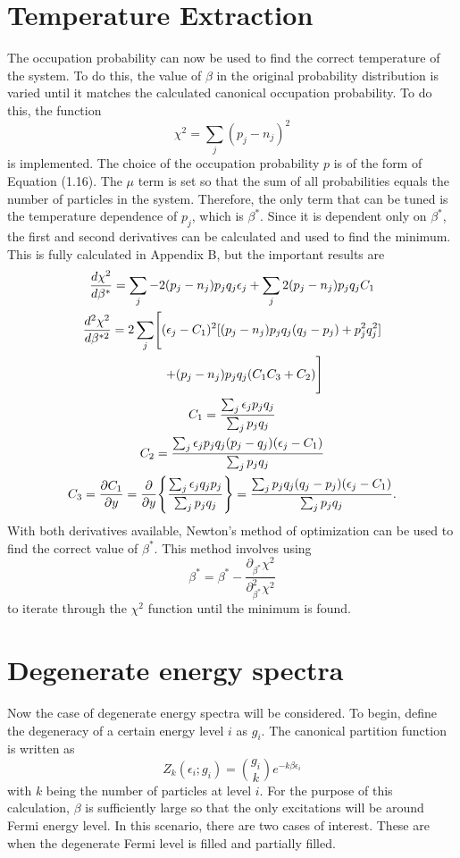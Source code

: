 \section{Temperature Extraction}
The occupation probability can now be used to find the correct temperature of the system. To do this, the value of $\beta$ in the original probability distribution is varied until it matches the calculated canonical occupation probability. To do this, the function 
\begin{equation}
    \chi^2=\sum_j(p_j-n_j)^2
\end{equation}
is implemented. The choice of the occupation probability $p$ is of the form of Equation (1.16). The $\mu$ term is set so that the sum of all probabilities equals the number of particles in the system. Therefore, the only term that can be tuned is the temperature dependence of $p_j$, which is $\beta^*$. Since it is dependent only on $\beta^*$, the first and second derivatives can be calculated and used to find the minimum. This is fully calculated in Appendix B, but the important results are 
\begin{gather}
    \frac{d\chi^2}{d\beta^*}=\sum_j -2(p_j-n_j)p_j q_j \epsilon_j+\sum_j 2(p_j-n_j)p_j q_j C_1\\
    \frac{d^2\chi^2}{d\beta^{*2}}=2\sum_j\Biggr[(\epsilon_j-C_1)^2[(p_j-n_j)p_jq_j(q_j-p_j)+p_j^2q_j^2]\nonumber\\
    \ \ \ \ \ \ +(p_j-n_j)p_jq_j(C_1C_3+C_2)\Biggr]\\
    C_1=\frac{\sum_j \epsilon_j p_j q_j}{\sum_j p_j q_j}\\
    C_2=\frac{\sum_j \epsilon_j p_j q_j(p_j - q_j)(\epsilon_j-C_1)}{\sum_j p_j q_j}\\
    C_3=\frac{\partial C_1}{\partial y}=\frac{\partial}{\partial 
    y}\qty{\frac{\sum_j \epsilon_j q_j p_j}{\sum_j p_j q_j}}=\frac{\sum_j p_j q_j(q_j-p_j)(\epsilon_j-C_1)}{\sum_j p_j q_j}.
\end{gather}
With both derivatives available, Newton's method of optimization can be used to find the correct value of $\beta^*$. This method involves using 
\begin{equation}
    \beta^*=\beta^*-\frac{\partial_{\beta^*}\chi^2}{\partial^2_{\beta^*}\chi^2}
\end{equation}
to iterate through the $\chi^2$ function until the minimum is found.

\section{Degenerate energy spectra}
Now the case of degenerate energy spectra will be considered. To begin, define the degeneracy of a certain energy level $i$ as $g_i$. The canonical partition function is written as
\begin{equation}
    Z_k(\epsilon_i;g_i)={g_i \choose k} e^{-k\beta\epsilon_i}
\end{equation}
with $k$ being the number of particles at level $i$.  For the purpose of this calculation, $\beta$ is sufficiently large so that the only excitations will be around Fermi energy level. In this scenario, there are two cases of interest. These are when the degenerate Fermi level is filled and partially filled. 
